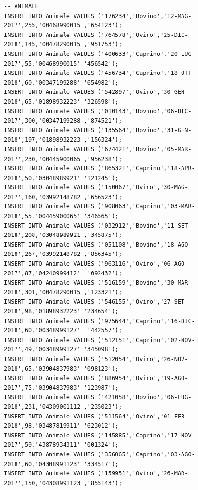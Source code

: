 \documentclass[12pt]{report}
\begin{document}
\begin{scriptsize}
\begin{verbatim}
-- ANIMALE
INSERT INTO Animale VALUES ('176234','Bovino','12-MAG-2017',255,'00468990015','654123');
INSERT INTO Animale VALUES ('764578','Ovino','25-DIC-2018',145,'00478290015','951753');
INSERT INTO Animale VALUES ('400633','Caprino','20-LUG-2017',55,'00468990015','456542');
INSERT INTO Animale VALUES ('456734','Caprino','18-OTT-2018',60,'00347199288','654982');
INSERT INTO Animale VALUES ('542897','Ovino','30-GEN-2018',65,'01898932223','326598');
INSERT INTO Animale VALUES ('010143','Bovino','06-DIC-2017',300,'00347199288','874521');
INSERT INTO Animale VALUES ('135564','Bovino','31-GEN-2018',197,'01898932223','156324');
INSERT INTO Animale VALUES ('674421','Bovino','05-MAR-2017',230,'00445900065','956238');
INSERT INTO Animale VALUES ('865321','Caprino','18-APR-2018',50,'03048989921','121245');
INSERT INTO Animale VALUES ('150067','Ovino','30-MAG-2017',160,'03992148782','656523');
INSERT INTO Animale VALUES ('908063','Caprino','03-MAR-2018',55,'00445900065','346565');
INSERT INTO Animale VALUES ('032912','Bovino','11-SET-2018',208,'03048989921','345875');
INSERT INTO Animale VALUES ('051108','Bovino','18-AGO-2018',267,'03992148782','856345');
INSERT INTO Animale VALUES ('963116','Ovino','06-AGO-2017',87,'04240999412', '092432');
INSERT INTO Animale VALUES ('516159','Bovino','30-MAR-2018',301,'00478290015','123321');
INSERT INTO Animale VALUES ('546155','Ovino','27-SET-2018',98,'01898932223','234654');
INSERT INTO Animale VALUES ('975644','Caprino','16-DIC-2018',60,'00348999127', '442557');
INSERT INTO Animale VALUES ('512151','Caprino','02-NOV-2017',49,'00348999127','345098');
INSERT INTO Animale VALUES ('512054','Ovino','26-NOV-2018',65,'03904837983','098123');
INSERT INTO Animale VALUES ('886954','Ovino','19-AGO-2017',75,'03904837983','123987');
INSERT INTO Animale VALUES ('421058','Bovino','06-LUG-2018',231,'04309001112','235023');
INSERT INTO Animale VALUES ('511564','Ovino','01-FEB-2018',98,'03487819911','623012');
INSERT INTO Animale VALUES ('145885','Caprino','17-NOV-2017',59,'43878934311','001324');
INSERT INTO Animale VALUES ('356065','Caprino','03-AGO-2018',60,'04308991123','334517');
INSERT INTO Animale VALUES ('159951','Ovino','26-MAR-2017',150,'04308991123','855143');


\end{verbatim}
\end{scriptsize}
\end{document}
